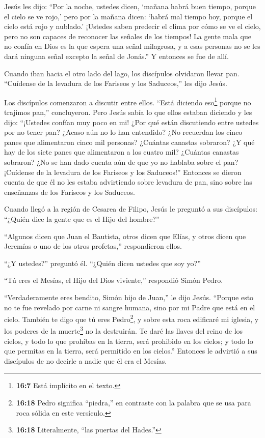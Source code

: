  Jesús les dijo: ``Por la noche, ustedes dicen, `mañana
habrá buen tiempo, porque el cielo se ve rojo,'  pero por la
mañana dicen: `habrá mal tiempo hoy, porque el cielo está rojo y
nublado.' ¡Ustedes saben predecir el clima por cómo se ve el cielo, pero
no son capaces de reconocer las señales de los tiempos!  La
gente mala que no confía en Dios es la que espera una señal milagrosa, y
a esas personas no se les dará ninguna señal excepto la señal de
Jonás.'' Y entonces se fue de allí.

 Cuando iban hacia el otro lado del lago, los discípulos
olvidaron llevar pan.  ``Cuídense de la levadura de los
Fariseos y los Saduceos,'' les dijo Jesús.

 Los discípulos comenzaron a discutir entre ellos. ``Está
diciendo eso\footnote{\textbf{16:7} Está implícito en el texto.} porque
no trajimos pan,'' concluyeron.  Pero Jesús sabía lo que
ellos estaban diciendo y les dijo: ``¡Ustedes confían muy poco en mi!
¿Por qué están discutiendo entre ustedes por no tener pan? 
¿Acaso aún no lo han entendido? ¿No recuerdan los cinco panes que
alimentaron cinco mil personas? ¿Cuántas canastas sobraron?
 ¿Y qué hay de los siete panes que alimentaron a los cuatro
mil? ¿Cuántas canastas sobraron?  ¿No se han dado cuenta
aún de que yo no hablaba sobre el pan? ¡Cuídense de la levadura de los
Fariseos y los Saduceos!''  Entonces se dieron cuenta de
que él no les estaba advirtiendo sobre levadura de pan, sino sobre las
enseñanzas de los Fariseos y los Saduceos.

 Cuando llegó a la región de Cesarea de Filipo, Jesús le
preguntó a sus discípulos: ``¿Quién dice la gente que es el Hijo del
hombre?''

 ``Algunos dicen que Juan el Bautista, otros dicen que
Elías, y otros dicen que Jeremías o uno de los otros profetas,''
respondieron ellos.

 ``¿Y ustedes?'' preguntó él. ``¿Quién dicen ustedes que
soy yo?''

 ``Tú eres el Mesías, el Hijo del Dios viviente,''
respondió Simón Pedro.

 ``Verdaderamente eres bendito, Simón hijo de Juan,'' le
dijo Jesús. ``Porque esto no te fue revelado por carne ni sangre humana,
sino por mi Padre que está en el cielo.  También te digo
que tú eres Pedro\footnote{\textbf{16:18} Pedro significa ``piedra,'' en
  contraste con la palabra que se usa para roca sólida en este
  versículo.}, y sobre esta roca edificaré mi iglesia, y los poderes de
la muerte\footnote{\textbf{16:18} Literalmente, ``las puertas del
  Hades.''} no la destruirán.  Te daré las llaves del reino
de los cielos, y todo lo que prohíbas en la tierra, será prohibido en
los cielos; y todo lo que permitas en la tierra, será permitido en los
cielos.''  Entonces le advirtió a sus discípulos de no
decirle a nadie que él era el Mesías.

